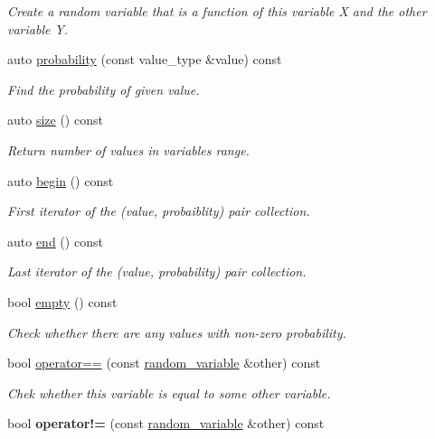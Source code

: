 \begin{DoxyCompactItemize}
\begin{DoxyCompactList}\small\item\em Create a random variable that is a function of this variable X and the other variable Y. \end{DoxyCompactList}\item 
auto \mbox{\hyperlink{classdice_1_1random__variable_a0759c25151ebb5618e2ff0ecbb91c80d}{probability}} (const value\+\_\+type \&value) const
\begin{DoxyCompactList}\small\item\em Find the probability of given value. \end{DoxyCompactList}\item 
auto \mbox{\hyperlink{classdice_1_1random__variable_a60637ec353c3cd3046017d54824f1fd8}{size}} () const
\begin{DoxyCompactList}\small\item\em Return number of values in variable\textquotesingle{}s range. \end{DoxyCompactList}\item 
auto \mbox{\hyperlink{classdice_1_1random__variable_ad65ca036dd0c61483c888579b2d912fa}{begin}} () const
\begin{DoxyCompactList}\small\item\em First iterator of the (value, probaiblity) pair collection. \end{DoxyCompactList}\item 
auto \mbox{\hyperlink{classdice_1_1random__variable_a82f50939d82419d9f86901b6997ca8fe}{end}} () const
\begin{DoxyCompactList}\small\item\em Last iterator of the (value, probability) pair collection. \end{DoxyCompactList}\item 
bool \mbox{\hyperlink{classdice_1_1random__variable_a113037d3c11921f1ba1227a838781d3e}{empty}} () const
\begin{DoxyCompactList}\small\item\em Check whether there are any values with non-\/zero probability. \end{DoxyCompactList}\item 
bool \mbox{\hyperlink{classdice_1_1random__variable_abe0ae85dfb81c7f5b7c921db588eda17}{operator==}} (const \mbox{\hyperlink{classdice_1_1random__variable}{random\+\_\+variable}} \&other) const
\begin{DoxyCompactList}\small\item\em Chek whether this variable is equal to some other variable. \end{DoxyCompactList}\item 
\mbox{\label{classdice_1_1random__variable_a46dbbc3797032825e095a658ff18d3ec}} 
bool {\bfseries operator!=} (const \mbox{\hyperlink{classdice_1_1random__variable}{random\+\_\+variable}} \&other) const
\end{DoxyCompactItemize}
